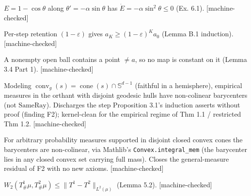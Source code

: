\begin{lemma}\label{lem:lyap}\leanok
$E=1-\cos\theta$ along $\theta'=-\alpha\sin\theta$ has $\dot E = -\alpha\sin^2\theta\le 0$ (Ex. 6.1). [machine-checked]
\end{lemma}

\begin{lemma}\label{lem:chain}\leanok
Per-step retention $(1-\varepsilon)$ gives $a_K \ge (1-\varepsilon)^K a_0$ (Lemma B.1 induction). [machine-checked]
\end{lemma}

\begin{lemma}[Pigeonhole, L10]\label{lem:pigeon}\leanok
A nonempty open ball contains a point $\ne a$, so no map is constant on it (Lemma 3.4 Part 1). [machine-checked]
\end{lemma}

\begin{lemma}\label{lem:noncol}\leanok
Modeling $\operatorname{conv}_g(s)=\operatorname{cone}(s)\cap\mathbb S^{d-1}$ (faithful in a
hemisphere), empirical measures in the orthant with disjoint geodesic hulls have non-colinear
barycenters (not $\mathrm{SameRay}$). Discharges the step Proposition 3.1's induction asserts without
proof (finding F2); kernel-clean for the empirical regime of Thm 1.1 / restricted Thm 1.2. [machine-checked]
\end{lemma}

\begin{lemma}\label{lem:noncolgen}\leanok
For arbitrary probability measures supported in disjoint closed convex cones the barycenters are
non-colinear, via Mathlib's \texttt{Convex.integral\_mem} (the barycenter lies in any closed convex
set carrying full mass). Closes the general-measure residual of F2 with no new axioms. [machine-checked]
\end{lemma}

\begin{lemma}\label{lem:l52}\leanok
$W_2(T^1_\#\mu, T^2_\#\mu) \le \|T^1-T^2\|_{L^2(\mu)}$ (Lemma 5.2). [machine-checked]
\end{lemma}


